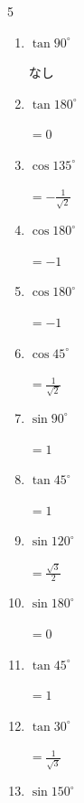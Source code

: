 \begin{multicols}{5}
\begin{enumerate}
        $\displaystyle =\frac{1}{\sqrt{2}}$

\columnbreak %

\resetques

  \item $\displaystyle \tan{90^\circ}$

        $\displaystyle なし$

  \item $\displaystyle \tan{180^\circ}$

        $\displaystyle =0$

  \item $\displaystyle \cos{135^\circ}$

        $\displaystyle =-\frac{1}{\sqrt{2}}$

  \item $\displaystyle \cos{180^\circ}$

        $\displaystyle =-1$

  \item $\displaystyle \cos{180^\circ}$

        $\displaystyle =-1$

  \item $\displaystyle \cos{45^\circ}$

        $\displaystyle =\frac{1}{\sqrt{2}}$

  \item $\displaystyle \sin{90^\circ}$

        $\displaystyle =1$

  \item $\displaystyle \tan{45^\circ}$

        $\displaystyle =1$

  \item $\displaystyle \sin{120^\circ}$

        $\displaystyle =\frac{\sqrt{3}}{2}$

  \item $\displaystyle \sin{180^\circ}$

        $\displaystyle =0$

  \item $\displaystyle \tan{45^\circ}$

        $\displaystyle =1$

  \item $\displaystyle \tan{30^\circ}$

        $\displaystyle =\frac{1}{\sqrt{3}}$

  \item $\displaystyle \sin{150^\circ}$


\end{enumerate}
\end{multicols}
